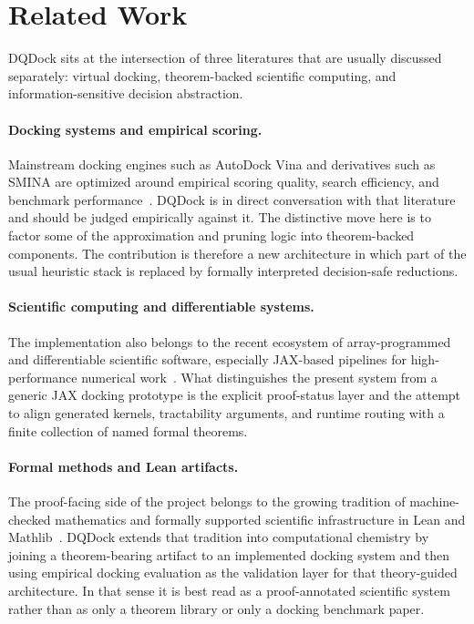 \section{Related Work}

DQDock sits at the intersection of three literatures that are usually discussed separately: virtual docking, theorem-backed scientific computing, and information-sensitive decision abstraction.

\paragraph{Docking systems and empirical scoring.}
Mainstream docking engines such as AutoDock Vina and derivatives such as SMINA are optimized around empirical scoring quality, search efficiency, and benchmark performance~\cite{trott2010autodock,koes2013smina}. DQDock is in direct conversation with that literature and should be judged empirically against it. The distinctive move here is to factor some of the approximation and pruning logic into theorem-backed components. The contribution is therefore a new architecture in which part of the usual heuristic stack is replaced by formally interpreted decision-safe reductions.

\paragraph{Scientific computing and differentiable systems.}
The implementation also belongs to the recent ecosystem of array-programmed and differentiable scientific software, especially JAX-based pipelines for high-performance numerical work~\cite{jax2018}. What distinguishes the present system from a generic JAX docking prototype is the explicit proof-status layer and the attempt to align generated kernels, tractability arguments, and runtime routing with a finite collection of named formal theorems.

\paragraph{Formal methods and Lean artifacts.}
The proof-facing side of the project belongs to the growing tradition of machine-checked mathematics and formally supported scientific infrastructure in Lean and Mathlib~\cite{moura2021lean4,mathlib2020}. DQDock extends that tradition into computational chemistry by joining a theorem-bearing artifact to an implemented docking system and then using empirical docking evaluation as the validation layer for that theory-guided architecture. In that sense it is best read as a proof-annotated scientific system rather than as only a theorem library or only a docking benchmark paper.
